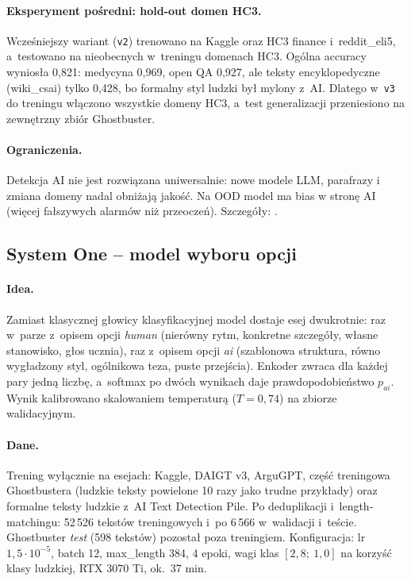 \paragraph{Eksperyment pośredni: hold-out domen HC3.}
Wcześniejszy wariant (\texttt{v2}) trenowano na Kaggle oraz HC3 finance
i~reddit\_eli5, a~testowano na nieobecnych w~treningu domenach HC3. Ogólna
accuracy wyniosła 0,821: medycyna 0,969, open QA 0,927, ale teksty
encyklopedyczne (wiki\_csai) tylko 0,428, bo formalny styl ludzki był mylony
z~AI. Dlatego w~\texttt{v3} do treningu włączono wszystkie domeny HC3,
a~test generalizacji przeniesiono na zewnętrzny zbiór Ghostbuster.

\paragraph{Ograniczenia.}
Detekcja AI nie jest rozwiązana uniwersalnie: nowe modele LLM, parafrazy i
zmiana domeny nadal obniżają jakość. Na OOD model ma bias w stronę AI
(więcej fałszywych alarmów niż przeoczeń). Szczegóły: .

\subsection{System One -- model wyboru opcji}

\paragraph{Idea.}
Zamiast klasycznej głowicy klasyfikacyjnej model dostaje esej dwukrotnie: raz
w~parze z~opisem opcji \textit{human} (nierówny rytm, konkretne szczegóły,
własne stanowisko, głos ucznia), raz z~opisem opcji \textit{ai} (szablonowa
struktura, równo wygładzony styl, ogólnikowa teza, puste przejścia). Enkoder
 zwraca dla każdej pary jedną liczbę, a~softmax
po dwóch wynikach daje prawdopodobieństwo \(p_{ai}\). Wynik kalibrowano
skalowaniem temperaturą (\(T = 0{,}74\)) na zbiorze walidacyjnym.

\paragraph{Dane.}
Trening wyłącznie na esejach: Kaggle, DAIGT v3, ArguGPT, część treningowa
Ghostbustera (ludzkie teksty powielone 10 razy jako trudne przykłady) oraz
formalne teksty ludzkie z~AI Text Detection Pile. Po deduplikacji
i~length-matchingu: 52\,526 tekstów treningowych i~po 6\,566 w~walidacji
i~teście. Ghostbuster \textit{test} (598 tekstów) pozostał poza treningiem.
Konfiguracja: lr \(1{,}5 \cdot 10^{-5}\), batch 12, max\_length 384, 4 epoki,
wagi klas \([2{,}8;\ 1{,}0]\) na korzyść klasy ludzkiej, RTX 3070 Ti, ok.\ 37 min.

